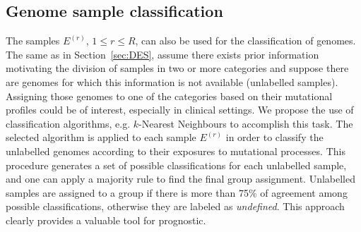 \documentclass{bioinfo}
\begin{document}
\subsection{Genome sample classification}\label{sec:Class}
The samples $E^{(r)}$, $1\leq r\leq R$, can also be used for the
classification of genomes. The same as in Section~\ref{sec:DES},
assume there exists prior information motivating the
division of samples in two or more categories and suppose there are
genomes for which this information is not available
(unlabelled samples). Assigning those genomes to one of the categories
based on their mutational profiles could be of interest, especially
in clinical settings. We propose the use of classification
algorithms, e.g. $k$-Nearest Neighbours to accomplish this task. The
selected algorithm is applied to each sample $E^{(r)}$ in order to
classify the unlabelled genomes according to their exposures to
mutational processes.  This procedure generates a set of possible
classifications for each unlabelled sample, and one can apply a
majority rule to find the final group assignment.  Unlabelled samples
are assigned to a group if there is more than 75\% of agreement among
possible classifications, otherwise they are labeled as
\textit{undefined}. This approach clearly provides a valuable tool
for prognostic.
\end{document}
